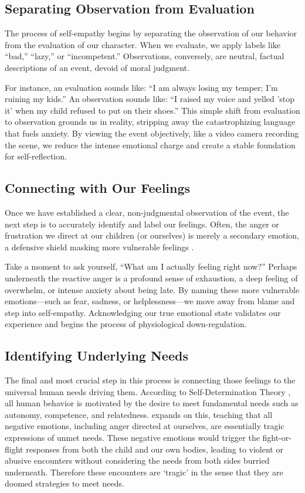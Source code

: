 \subsection{Separating Observation from Evaluation}
The process of self-empathy begins by separating the observation of our behavior from the evaluation of our character.
When we evaluate, we apply labels like ``bad,'' ``lazy,'' or ``incompetent.''
Observations, conversely, are neutral, factual descriptions of an event, devoid of moral judgment.

For instance, an evaluation sounds like: ``I am always losing my temper; I'm ruining my kids.''
An observation sounds like: ``I raised my voice and yelled 'stop it' when my child refused to put on their shoes.''
This simple shift from evaluation to observation grounds us in reality, stripping away the catastrophizing language that fuels anxiety.
By viewing the event objectively, like a video camera recording the scene, we reduce the intense emotional charge and create a stable foundation for self-reflection.

\subsection{Connecting with Our Feelings}
Once we have established a clear, non-judgmental observation of the event, the next step is to accurately identify and label our feelings.
Often, the anger or frustration we direct at our children (or ourselves) is merely a secondary emotion, a defensive shield masking more vulnerable feelings \citep{ekman1992}.

Take a moment to ask yourself, ``What am I actually feeling right now?''
Perhaps underneath the reactive anger is a profound sense of exhaustion, a deep feeling of overwhelm, or intense anxiety about being late.
By naming these more vulnerable emotions---such as fear, sadness, or helplessness---we move away from blame and step into self-empathy.
Acknowledging our true emotional state validates our experience and begins the process of physiological down-regulation.

\subsection{Identifying Underlying Needs}
The final and most crucial step in this process is connecting those feelings to the universal human needs driving them.
According to Self-Determination Theory \citep{deci2000}, all human behavior is motivated by the desire to meet fundamental needs such as autonomy, competence, and relatedness.
\citet{rosenberg2003} expands on this, teaching that all negative emotions, including anger directed at ourselves, are essentially tragic expressions of unmet needs.
These negative emotions would trigger the fight-or-flight responses from both the child and our own bodies, leading to violent or abusive encounters without considering the needs from both sides burried underneath.
Therefore these encounters are `tragic' in the sense that they are doomed strategies to meet needs.


